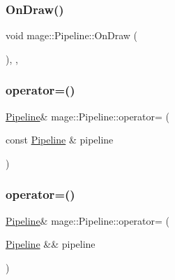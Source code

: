 \subsubsection{\texorpdfstring{On\+Draw()}{OnDraw()}}
{\footnotesize\ttfamily void mage\+::\+Pipeline\+::\+On\+Draw (\begin{DoxyParamCaption}{ }\end{DoxyParamCaption})\hspace{0.3cm}{\ttfamily [static]}, {\ttfamily [private]}, {\ttfamily [noexcept]}}

\hypertarget{structmage_1_1_pipeline_a517aa5196bfe4bd84f5f789e277f374e}{}\label{structmage_1_1_pipeline_a517aa5196bfe4bd84f5f789e277f374e} 
\subsubsection{\texorpdfstring{operator=()}{operator=()}\hspace{0.1cm}{\footnotesize\ttfamily [1/2]}}
{\footnotesize\ttfamily \hyperlink{structmage_1_1_pipeline}{Pipeline}\& mage\+::\+Pipeline\+::operator= (\begin{DoxyParamCaption}\item[{const \hyperlink{structmage_1_1_pipeline}{Pipeline} \&}]{pipeline }\end{DoxyParamCaption})\hspace{0.3cm}{\ttfamily [delete]}}

\hypertarget{structmage_1_1_pipeline_ad2ef272f32b0a792910ff04460753c5d}{}\label{structmage_1_1_pipeline_ad2ef272f32b0a792910ff04460753c5d} 
\subsubsection{\texorpdfstring{operator=()}{operator=()}\hspace{0.1cm}{\footnotesize\ttfamily [2/2]}}
{\footnotesize\ttfamily \hyperlink{structmage_1_1_pipeline}{Pipeline}\& mage\+::\+Pipeline\+::operator= (\begin{DoxyParamCaption}\item[{\hyperlink{structmage_1_1_pipeline}{Pipeline} \&\&}]{pipeline }\end{DoxyParamCaption})\hspace{0.3cm}{\ttfamily [delete]}}

